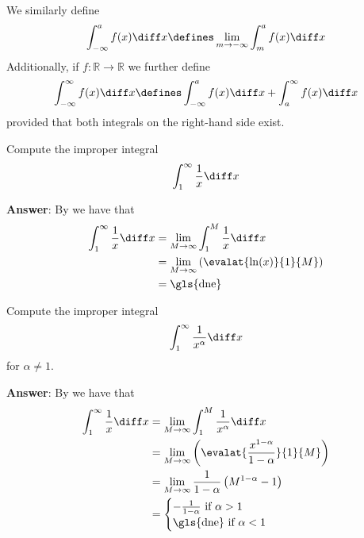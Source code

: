 \begin{rem}\label{rem-improper-integral}
	We similarly define
	\begin{equation}\label{eq-improper-integral:2}
		\int_{-\infty}^a f(x) \diff x \defines \lim_{m\to-\infty} \int_m^a f(x) \diff x
	\end{equation}
	Additionally, if $f:\mathbb{R}\to\mathbb{R}$ we further define
	\begin{equation}\label{eq-improper-integral:3}
		\int_{-\infty}^\infty f(x) \diff x \defines \int_{-\infty}^a f(x) \diff x + \int_a^\infty f(x) \diff x
	\end{equation}
	provided that both integrals on the right-hand side exist.
\end{rem}

\begin{exm}\label{exm-improper-integral:3}
	Compute the improper integral
	\begin{equation*}
		\int_1^\infty \frac{1}{x} \diff x
	\end{equation*}
	\begin{flushleft}
		\textbf{Answer}: By  we have that
		\begin{align*}
			\int_1^\infty \frac{1}{x} \diff x
			 & = \lim_{M\to\infty} \int_1^M \frac{1}{x} \diff x       \\
			 & = \lim_{M\to\infty} \left(\evalat{\ln(x)}{1}{M}\right) \\
			 & = \text{\gls{dne}}
		\end{align*}
	\end{flushleft}
\end{exm}

\begin{exm}\label{exm-improper-integral:4}
	Compute the improper integral
	\begin{equation*}
		\int_1^\infty \frac{1}{x^\alpha} \diff x
	\end{equation*}
	for $\alpha\neq1$.
	\begin{flushleft}
		\textbf{Answer}: By  we have that
		\begin{align*}
			\int_1^\infty \frac{1}{x} \diff x
			 & = \lim_{M\to\infty} \int_1^M \frac{1}{x^\alpha} \diff x                       \\
			 & = \lim_{M\to\infty} \left(\evalat{\frac{x^{1-\alpha}}{1-\alpha}}{1}{M}\right) \\
			 & = \lim_{M\to\infty} \frac{1}{1-\alpha}\left(M^{1-\alpha}-1\right)             \\
			 & = \begin{cases}
				-\frac{1}{1-\alpha}\text{ if }\alpha>1 \\
				\text{\gls{dne} if }\alpha<1
			\end{cases}
		\end{align*}
	\end{flushleft}
\end{exm}

